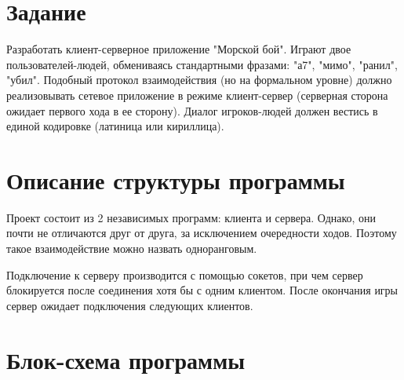 \section*{Задание}

Разработать клиент-серверное приложение "Морской бой". Играют двое
пользователей-людей, обмениваясь стандартными фразами: "а7", "мимо", "ранил",
"убил". Подобный протокол взаимодействия (но на формальном уровне) должно
реализовывать сетевое приложение в режиме клиент-сервер (серверная сторона
ожидает первого хода в ее сторону). Диалог игроков-людей должен вестись в единой
кодировке (латиница или кириллица).

\newpage

\section*{Описание структуры программы}

Проект состоит из 2 независимых программ: клиента и сервера.
Однако, они почти не отличаются друг от друга, за исключением очередности ходов.
Поэтому такое взаимодействие можно назвать одноранговым.

Подключение к серверу производится с помощью сокетов, при чем сервер блокируется
после соединения хотя бы с одним клиентом. После окончания игры сервер ожидает
подключения следующих клиентов.
 
\newpage

\section*{Блок-схема программы}

